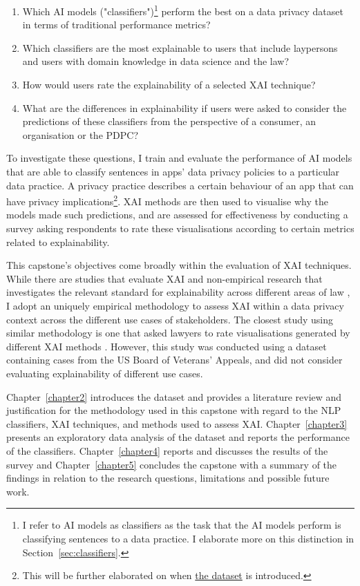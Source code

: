 \begin{enumerate}
  \item Which AI models ("classifiers")\footnote{I refer to AI models as classifiers as the task that the AI models perform is classifying sentences to a data practice. I elaborate more on this distinction in Section~\ref{sec:classifiers}.} perform the best on a data privacy dataset in terms of traditional performance metrics?
  \item Which classifiers are the most explainable to users that include laypersons and users with domain knowledge in data science and the law?
  \item How would users rate the explainability of a selected XAI technique?
  \item What are the differences in explainability if users were asked to consider the predictions of these classifiers from the perspective of a consumer, an organisation or the PDPC?
\end{enumerate}

To investigate these questions, I train and evaluate the performance of AI models that are able to classify sentences in apps' data privacy policies to a particular data practice. A privacy practice describes a certain behaviour of an app that can have privacy implications\footnote{This will be further elaborated on when \hyperref[app350_corpus]{the dataset} is introduced.}. XAI methods are then used to visualise why the models made such predictions, and are assessed for effectiveness by conducting a survey asking respondents to rate these visualisations according to certain metrics related to explainability.

This capstone's objectives come broadly within the evaluation of XAI techniques. While there are studies that evaluate XAI and non-empirical research that investigates the relevant standard for explainability across different areas of law \cite{hacker2022varieties}, I adopt an uniquely empirical methodology to assess XAI within a data privacy context across the different use cases of stakeholders. The closest study using similar methodology is one that asked lawyers to rate visualisations generated by different XAI methods \cite{gorski2021}. However, this study was conducted using a dataset containing cases from the US Board of Veterans' Appeals, and did not consider evaluating explainability of different use cases.

Chapter~\ref{chapter2} introduces the dataset and provides a literature review and justification for the methodology used in this capstone with regard to the NLP classifiers, XAI techniques, and methods used to assess XAI. Chapter~\ref{chapter3} presents an exploratory data analysis of the dataset and reports the performance of the classifiers. Chapter~\ref{chapter4} reports and discusses the results of the survey and Chapter~\ref{chapter5} concludes the capstone with a summary of the findings in relation to the research questions, limitations and possible future work.